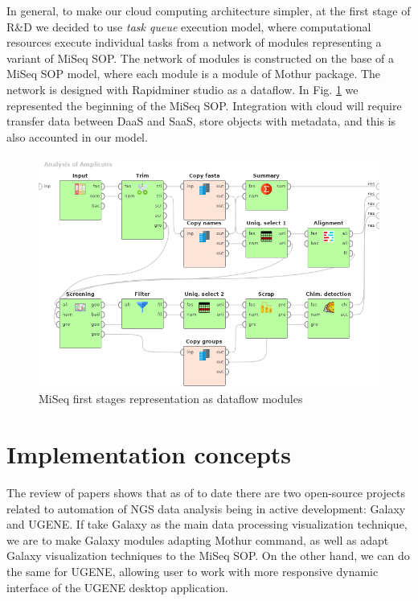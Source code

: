 \documentclass[a4paper]{jpconf}
\begin{document}
In general, to make our cloud computing architecture simpler, at the first stage of R\&D we decided to use \emph{task queue} execution model, where computational resources execute individual tasks from a network of modules representing a variant of MiSeq SOP.  The network of modules is constructed on the base of a MiSeq SOP model, where each module is a module of Mothur package.  The network is designed with Rapidminer studio as a dataflow. In Fig. \ref{fig:mothur} we represented the beginning of the MiSeq SOP.  Integration with cloud will require transfer data between DaaS and SaaS, store objects with metadata, and this is also accounted in our model.




\begin{figure}[bt]
  \centering
   \includegraphics[width=0.7\linewidth]{Dataflow-color-en.png}
  \caption{MiSeq first stages representation as dataflow modules \cite{cherk19}}
  \label{fig:mothur}
\end{figure}


\section{Implementation concepts}

The review of papers shows that as of to date there are two open-source projects related to automation of NGS data analysis being in active development: Galaxy and UGENE.  If take Galaxy as the main data processing visualization technique, we are to make Galaxy modules adapting Mothur command, as well as adapt Galaxy visualization techniques to the MiSeq SOP.  On the other hand, we can do the same for UGENE, allowing user to work with more responsive dynamic interface of the UGENE desktop application.
\end{document}
